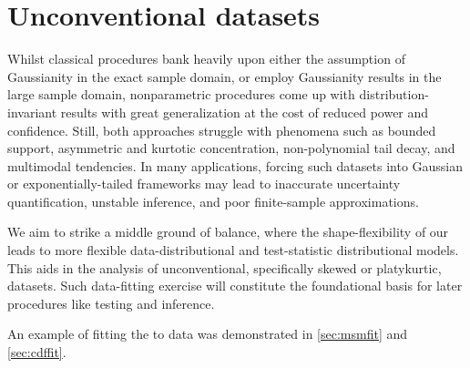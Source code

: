 \section{Unconventional datasets}
Whilst classical procedures bank heavily upon either the assumption of Gaussianity in the exact sample domain, or employ Gaussianity results in the large sample domain, nonparametric procedures come up with distribution-invariant results with great generalization at the cost of reduced power and confidence. Still, both approaches struggle with phenomena such as bounded support, asymmetric and kurtotic concentration, non-polynomial tail decay, and multimodal tendencies. In many applications, forcing such datasets into Gaussian or exponentially-tailed frameworks may lead to inaccurate uncertainty quantification, unstable inference, and poor finite-sample approximations.

We aim to strike a middle ground of balance, where the shape-flexibility of our \sindist{} leads to more flexible data-distributional and test-statistic distributional models. This aids in the analysis of unconventional, specifically skewed or platykurtic, datasets. Such data-fitting exercise will constitute the foundational basis for later procedures like testing and inference. 

An example of fitting the \sindist{} to data was demonstrated in \autoref{sec:msmfit} and \autoref{sec:cdffit}.